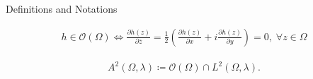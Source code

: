 \documentclass{reu_beamer}
\begin{document}
\begin{frame}{Definitions and Notations}
\begin{definition}
    \begin{align*}
        h\in \mathcal{O}(\Omega) \iff \frac{\partial h(z)}{\partial \bar{z}}= \frac{1}{2}\left(\frac{\partial h(z)}{\partial x} + i\frac{\partial h(z)}{\partial y} \right)= 0,\;\forall z\in\Omega
    \end{align*}
\end{definition} 

\begin{definition}
    \begin{align*}
        A^{2}(\Omega,\lambda) \coloneq \mathcal{O}(\Omega)\cap L^{2}(\Omega,\lambda).
    \end{align*}
\end{definition}
\end{frame}
\end{document}

